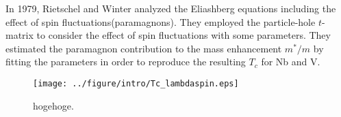 In 1979, Rietschel and Winter\cite{Rietschel1979} analyzed the Eliashberg
equations including the effect of spin fluctuations(paramagnons). They employed the particle-hole 
$t$-matrix\cite{Parks1969,Berk1966,Schrieffer1968} to consider the effect of spin fluctuations with 
some parameters. They estimated the paramagnon contribution to the mass enhancement $m^{\ast}/m$ 
by fitting the parameters in order to reproduce the resulting $T_c$ for Nb and V.

\begin{figure} %
	\centering
	\texttt{[image: ../figure/intro/Tc\_lambdaspin.eps]}
	\caption{hogehoge.}
	\label{fig:Tc_lambdaspin}
\end{figure}






